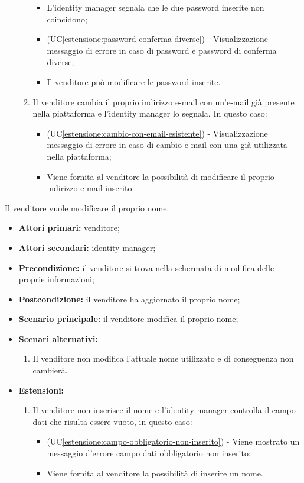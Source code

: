 \begin{itemize}
\begin{enumerate}[label=\lett]
    	\begin{itemize}
    		\item L'identity manager segnala che le due password inserite non coincidono;
    		\item (UC\ref{estensione:password-conferma-diverse}) - Visualizzazione messaggio di errore in caso di password e password di conferma diverse;
    		\item Il venditore può modificare le password inserite.
    	\end{itemize}
    	\item Il venditore cambia il proprio indirizzo e-mail con un'e-mail già presente nella piattaforma e l'identity manager lo segnala. In questo caso:
    	\begin{itemize}
    		\item (UC\ref{estensione:cambio-con-email-esistente}) - Visualizzazione messaggio di errore in caso di cambio e-mail con una già utilizzata nella piattaforma;
    		\item Viene fornita al venditore la possibilità di modificare il proprio indirizzo e-mail inserito.
    	\end{itemize}
    \end{enumerate}
\end{itemize}

\label{modifica-informazioni-venditore.nome}

Il venditore vuole modificare il proprio nome.
\begin{itemize}
	\item \textbf{Attori primari:} venditore;
	\item \textbf{Attori secondari:} identity manager;
	\item \textbf{Precondizione:} il venditore si trova nella schermata di modifica delle proprie informazioni;
	\item \textbf{Postcondizione:} il venditore ha aggiornato il proprio nome;
	\item \textbf{Scenario principale:} il venditore modifica il proprio nome;
	\item \textbf{Scenari alternativi:}
	\begin{enumerate}[label=\lett]
		\item Il venditore non modifica l'attuale nome utilizzato e di conseguenza non cambierà.
	\end{enumerate}
	\item \textbf{Estensioni:}
	\begin{enumerate}[label=\lett]
		\item Il venditore non inserisce il nome e l'identity manager controlla il campo dati che risulta essere vuoto, in questo caso:
		\begin{itemize}
			\item (UC\ref{estensione:campo-obbligatorio-non-inserito}) - Viene mostrato un messaggio d'errore campo dati obbligatorio non inserito;
			\item Viene fornita al venditore la possibilità di inserire un nome.
		\end{itemize}
	\end{enumerate} 
\end{itemize}

